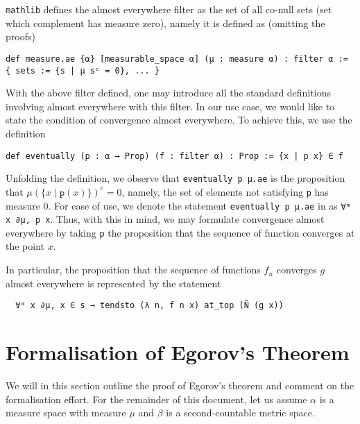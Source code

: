\documentclass[]{article}
\theoremstyle{definition}
\begin{document}
\texttt{mathlib} defines the almost everywhere filter as the set of all 
co-null sets (set which complement has measure zero), namely it is defined as
(omitting the proofs)
\begin{verbatim}
def measure.ae {α} [measurable_space α] (μ : measure α) : filter α :=
{ sets := {s | μ sᶜ = 0}, ... }
\end{verbatim}
With the above filter defined, one may introduce all the standard definitions involving 
almost everywhere with this filter. In our use case, we would like to state the 
condition of convergence almost everywhere. To achieve this, we use the definition
\begin{verbatim}
def eventually (p : α → Prop) (f : filter α) : Prop := {x | p x} ∈ f
\end{verbatim}
Unfolding the definition, we observe that \texttt{eventually p μ.ae} is 
the proposition that \(\mu(\{x \mid \mathtt{p}(x)\})^c = 0\), namely, 
the set of elements not satisfying \texttt{p} has measure 0. For ease of use, 
we denote the statement \texttt{eventually p μ.ae} in 
as \texttt{∀ᵐ x ∂μ, p x}. Thus, with this in mind, we may formulate 
convergence almost everywhere by taking \texttt{p} the proposition that the 
sequence of function converges at the point \(x\).

In particular, the proposition that the sequence of functions \(f_n\) converges 
\(g\) almost everywhere is represented by the statement 
\begin{verbatim}
  ∀ᵐ x ∂μ, x ∈ s → tendsto (λ n, f n x) at_top (Ñ (g x))
\end{verbatim}

\section*{Formalisation of Egorov's Theorem}

We will in this section outline the proof of Egorov's theorem and comment on the formalisation effort.
For the remainder of this document, let us assume \(\alpha\) is a measure space with measure \(\mu\) 
and \(\beta\) is a second-countable metric space.
\end{document}
